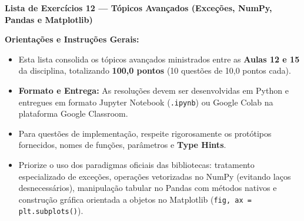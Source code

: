 \vspace{1cm}

\noindent \textbf{\Large Lista de Exercícios 12 — Tópicos Avançados (Exceções, NumPy, Pandas e Matplotlib)}

\vspace{0.3cm}
\noindent \textbf{Orientações e Instruções Gerais:}
\begin{itemize}[leftmargin=*]
    \item Esta lista consolida os tópicos avançados ministrados entre as \textbf{Aulas 12 e 15} da disciplina, totalizando \textbf{100,0 pontos} (10 questões de 10,0 pontos cada).
    \item \textbf{Formato e Entrega:} As resoluções devem ser desenvolvidas em Python e entregues em formato Jupyter Notebook (\texttt{.ipynb}) ou Google Colab na plataforma Google Classroom.
    \item Para questões de implementação, respeite rigorosamente os protótipos fornecidos, nomes de funções, parâmetros e \textbf{Type Hints}.
    \item Priorize o uso dos paradigmas oficiais das bibliotecas: tratamento especializado de exceções, operações vetorizadas no NumPy (evitando laços desnecessários), manipulação tabular no Pandas com métodos nativos e construção gráfica orientada a objetos no Matplotlib (\texttt{fig, ax = plt.subplots()}).
\end{itemize}

\vspace{0.5cm}

